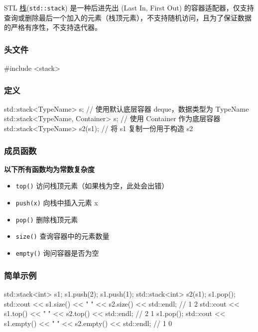 STL \href{../../ds/stack.md}{栈}(\texttt{std::stack}) 是一种后进先出 (Last In, First Out) 的容器适配器，仅支持查询或删除最后一个加入的元素（栈顶元素），不支持随机访问，且为了保证数据的严格有序性，不支持迭代器。

\subsubsection{头文件}\label{ux5934ux6587ux4ef6}


\begin{codeline}
#include <stack>
\end{codeline}


\subsubsection{定义}\label{ux5b9aux4e49}


\begin{codeline}
std::stack<TypeName> s;  // 使用默认底层容器 deque，数据类型为 TypeName
std::stack<TypeName, Container> s;  // 使用 Container 作为底层容器
std::stack<TypeName> s2(s1);        // 将 s1 复制一份用于构造 s2
\end{codeline}


\subsubsection{成员函数}\label{ux6210ux5458ux51fdux6570-1}

\textbf{以下所有函数均为常数复杂度}

\begin{itemize}
\tightlist
\item
  \texttt{top()} 访问栈顶元素（如果栈为空，此处会出错）
\item
  \texttt{push(x)} 向栈中插入元素 x
\item
  \texttt{pop()} 删除栈顶元素
\item
  \texttt{size()} 查询容器中的元素数量
\item
  \texttt{empty()} 询问容器是否为空
\end{itemize}

\subsubsection{简单示例}\label{ux7b80ux5355ux793aux4f8b}


\begin{codeline}
std::stack<int> s1;
s1.push(2);
s1.push(1);
std::stack<int> s2(s1);
s1.pop();
std::cout << s1.size() << " " << s2.size() << std::endl;  // 1 2
std::cout << s1.top() << " " << s2.top() << std::endl;    // 2 1
s1.pop();
std::cout << s1.empty() << " " << s2.empty() << std::endl;  // 1 0
\end{codeline}


